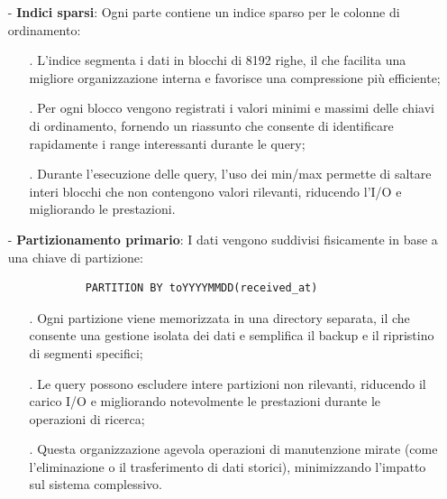 \documentclass[10pt]{article}
\begin{document}
\begin{itemize}
            \item[-] \textbf{Indici sparsi}: Ogni parte contiene un indice sparso per le colonne di ordinamento:
            \begin{itemize}
                \item[.] L'indice segmenta i dati in blocchi di 8192 righe, il che facilita una migliore organizzazione interna e favorisce una compressione più efficiente;
                \item[.] Per ogni blocco vengono registrati i valori minimi e massimi delle chiavi di ordinamento, fornendo un riassunto che consente di identificare rapidamente i range interessanti durante le query;
                \item[.] Durante l'esecuzione delle query, l'uso dei min/max permette di saltare interi blocchi che non contengono valori rilevanti, riducendo l'I/O e migliorando le prestazioni.    
            \end{itemize}

            \item[-] \textbf{Partizionamento primario}: I dati vengono suddivisi fisicamente in base a una chiave di partizione:
            \begin{lstlisting}
            PARTITION BY toYYYYMMDD(received_at)
            \end{lstlisting}
            \begin{itemize}
                \item[.] Ogni partizione viene memorizzata in una directory separata, il che consente una gestione isolata dei dati e semplifica il backup e il ripristino di segmenti specifici;
                \item[.] Le query possono escludere intere partizioni non rilevanti, riducendo il carico I/O e migliorando notevolmente le prestazioni durante le operazioni di ricerca;
                \item[.] Questa organizzazione agevola operazioni di manutenzione mirate (come l'eliminazione o il trasferimento di dati storici), minimizzando l'impatto sul sistema complessivo.
            \end{itemize}


\end{itemize}
\end{document}
